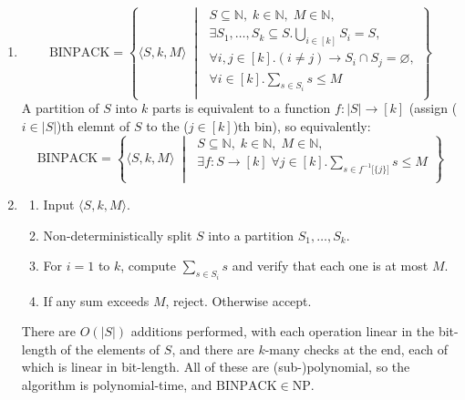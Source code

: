 \documentclass{article}
\theoremstyle{definition}
\theoremstyle{definition}
\theoremstyle{remark}
\begin{document}
\begin{enumerate}
    \item[$(i)$]\hfill
    \begin{equation*}
        \text{BINPACK}=\left\{\langle S,k,M\rangle\;\middle|\;\begin{gathered}
            S\subseteq\mathbb{N},\;k\in\mathbb{N},\;M\in\mathbb{N},\\
            \exists S_1,\ldots,S_k\subseteq S.
            \bigcup_{i\in[k]}S_i=S,\\
            \forall i,j\in[k].(i\neq j)\rightarrow S_i\cap S_j=\varnothing,\\
            \forall i\in[k].\sum_{s\in S_i}s\leq M\\
        \end{gathered}
        \right\}
    \end{equation*}
    A partition of $S$ into $k$ parts is equivalent to a function $f:|S|\rightarrow[k]$ (assign ($i\in |S|$)th elemnt of $S$ to the ($j\in[k]$)th bin), so equivalently:
    \begin{equation*}
        \text{BINPACK}=\left\{\langle S,k,M\rangle\;\middle|\;\begin{gathered}
            S\subseteq\mathbb{N},\;k\in\mathbb{N},\;M\in\mathbb{N},\\
            \exists f:S\rightarrow[k]\;\forall j\in[k].\sum_{s\in f^{-1}\bigl[\{j\}\bigr]}s\leq M\\
        \end{gathered}
        \right\}
    \end{equation*}

    \item[$(ii)$]\hfill
    \begin{enumerate}
        \item[$(1)$] Input $\langle S,k,M\rangle$.
        
        \item[$(2)$] Non-deterministically split $S$ into a partition $S_1,\ldots,S_k$.
    
        \item[$(3)$] For $i=1$ to $k$, compute $\sum_{s\in S_i}s$ and verify that each one is at most $M$.
    
        \item[$(4)$] If any sum exceeds $M$, reject. Otherwise accept.
    \end{enumerate}
    There are $O(|S|)$ additions performed, with each operation linear in the bit-length of the elements of $S$, and there are $k$-many checks at the end, each of which is linear in bit-length. All of these are (sub-)polynomial, so the algorithm is polynomial-time, and $\text{BINPACK}\in\mathrm{NP}$.
\end{enumerate}
\end{document}
